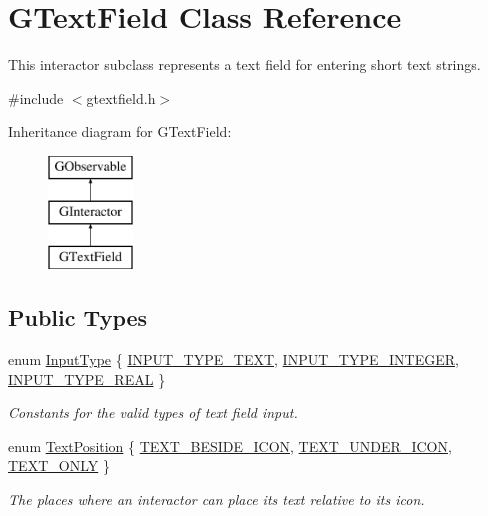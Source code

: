 \hypertarget{classsgl_1_1GTextField}{}\section{G\+Text\+Field Class Reference}
\label{classsgl_1_1GTextField}


This interactor subclass represents a text field for entering short text strings.  




{\ttfamily \#include $<$gtextfield.\+h$>$}

Inheritance diagram for G\+Text\+Field\+:\begin{figure}[H]
\begin{center}
\leavevmode
\includegraphics[height=3.000000cm]{classsgl_1_1GTextField}
\end{center}
\end{figure}
\subsection*{Public Types}
\begin{DoxyCompactItemize}
\item 
enum \mbox{\hyperlink{classsgl_1_1GTextField_a5fc772c800c3d40d2b95564e8a839bab}{Input\+Type}} \{ \mbox{\hyperlink{classsgl_1_1GTextField_a5fc772c800c3d40d2b95564e8a839babadbd6303eaf17fd7715ddca85f2ac3287}{I\+N\+P\+U\+T\+\_\+\+T\+Y\+P\+E\+\_\+\+T\+E\+XT}}, 
\mbox{\hyperlink{classsgl_1_1GTextField_a5fc772c800c3d40d2b95564e8a839babac37563ad86c1ac752795ed59e700be77}{I\+N\+P\+U\+T\+\_\+\+T\+Y\+P\+E\+\_\+\+I\+N\+T\+E\+G\+ER}}, 
\mbox{\hyperlink{classsgl_1_1GTextField_a5fc772c800c3d40d2b95564e8a839babab760f99baafaf18281fa72664f303938}{I\+N\+P\+U\+T\+\_\+\+T\+Y\+P\+E\+\_\+\+R\+E\+AL}}
 \}
\begin{DoxyCompactList}\small\item\em Constants for the valid types of text field input. \end{DoxyCompactList}\item 
enum \mbox{\hyperlink{classsgl_1_1GInteractor_a8e0d441725a81d2bbdebbea09078260e}{Text\+Position}} \{ \mbox{\hyperlink{classsgl_1_1GInteractor_a8e0d441725a81d2bbdebbea09078260ea4cd6f2e7d5a08d6f4dc052df2358f774}{T\+E\+X\+T\+\_\+\+B\+E\+S\+I\+D\+E\+\_\+\+I\+C\+ON}}, 
\mbox{\hyperlink{classsgl_1_1GInteractor_a8e0d441725a81d2bbdebbea09078260eaa88490f63d8de68d44c83bdb2ecde3b3}{T\+E\+X\+T\+\_\+\+U\+N\+D\+E\+R\+\_\+\+I\+C\+ON}}, 
\mbox{\hyperlink{classsgl_1_1GInteractor_a8e0d441725a81d2bbdebbea09078260ea39a6f388a30ac4fefb6eb13e846bc9f2}{T\+E\+X\+T\+\_\+\+O\+N\+LY}}
 \}
\begin{DoxyCompactList}\small\item\em The places where an interactor can place its text relative to its icon. \end{DoxyCompactList}\end{DoxyCompactItemize}
